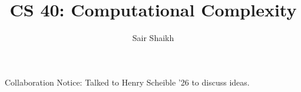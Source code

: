 \title{CS 40: Computational Complexity}

\author{Sair Shaikh}
\maketitle

Collaboration Notice: Talked to Henry Scheible '26 to discuss ideas.
